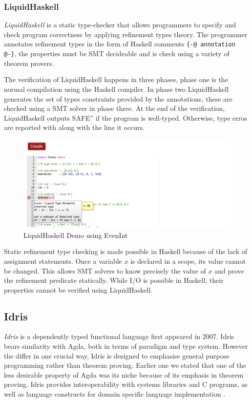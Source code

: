 \documentclass[a4paper,12pt]{report}
\begin{document}
\subsubsection{LiquidHaskell}
\textit{LiquidHaskell} is a static type-checker that allows programmers to specify and 
check program correctness by applying refinement types theory. The programmer 
annotates refinement types in the form of Haskell comments 
\verb|{-@ annotation @-}|, the properties must be SMT decideable and is check 
using a variety of theorem provers. 

\par
The verification of LiquidHaskell happens in three phases, phase one is the 
normal compilation using the Haskell compiler. In phase two LiquidHaskell 
generates the set of types constraints provided by the annotations, these are 
checked using a SMT solver in phase three. At the end of the verification, 
LiquidHaskell outputs \verb``SAFE'' if the program is well-typed. Otherwise, 
type erros are reported with along with the line it occurs. 

\begin{figure}[H] 
  \begin{center}
    \includegraphics[scale=0.5]{assets/lh_demo_sm.PNG}
  \end{center}
  \caption{LiquidHaskell Demo using EvenInt}
  \label{fig:lh_demo}
\end{figure}

\par
Static refinement type checking is made possible in Haskell because of the lack 
of assignment statements. Once a variable $x$ is declared in a scope, its value 
cannot be changed. This allows SMT solvers to know precisely the value of $x$ 
and prove the refinement predicate statically. While I/O is possible in 
Haskell, their properties cannot be verified using LiquidHaskell.

\subsection{Idris}
\textit{Idris} \cite{idris} is a dependently typed functional language first 
appeared in 2007. Idris bears similarity with Agda, both in terms of paradigm 
and type system. However the differ in one crucial way, Idris is designed to 
emphasise general purpose programming rather than theorem proving. Earlier one 
we stated that one of the less desirable property of Agda was its niche because 
of its emphasis in theorem proving. Idris provides 
interoperability with systems libraries and C programs, 
as well as language constructs for domain specific language 
implementation \cite{gpIdris}. 
\end{document}
